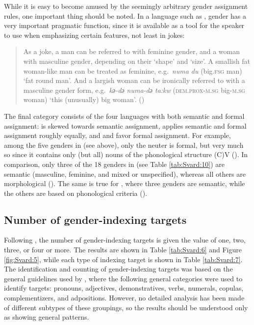 \documentclass[output=collectionpaper]{langsci/langscibook}
\begin{document}
While it is easy to become amused by the seemingly arbitrary gender assignment rules, one important thing should be noted. In a language such as , gender has a very important pragmatic function, since it is available as a tool for the speaker to use when emphasizing certain features, not least in jokes:

\begin{quote}
As a joke, a man can be referred to with feminine gender, and a woman with masculine gender, depending on their `shape' and `size'. A smallish fat woman-like man can be treated as feminine, e.g.\ \textit{numa du} (big.\textsc{fsg} man) `fat round man'. And a largish woman can be ironically referred to with a masculine gender form, e.g.\ \textit{kә-dә numa-dә ta:kw} (\textsc{dem.prox-m.sg} big-\textsc{m.sg} woman) `this (unusually) big woman'. (\citealt[121]{Aikhenvald2008})
\end{quote}

The final category consists of the four languages with both semantic and formal assignment:  is skewed towards semantic assignment,  applies semantic and formal assignment roughly equally, and  and  favor formal assignment. For example, among the five genders in  (see  above), only the neuter is formal, but very much so since it contains only (but all) nouns of the phonological structure (C)V (\citealt{Waelchli2018}). In comparison, only three of the 18 genders in  (see Table \ref{tab:Svard:10}) are semantic (masculine, feminine, and mixed or unspecified), whereas all others are morphological (\citealt[8]{Conrad1991}). The same is true for , where three genders are semantic, while the others are based on phonological criteria (\citealt[119]{Foley1991}).

\subsection{Number of gender-indexing targets}
\label{sec:Svard:3.4}

Following \citet[66]{DiGarbo2014}, the number of gender-indexing targets is given the value of one, two, three, or four or more. The results are shown in Table \ref{tab:Svard:6} and Figure \ref{fig:Svard:5}, while each type of indexing target is shown in Table \ref{tab:Svard:7}. The identification and counting of gender-indexing targets was based on the general guidelines used by \citet[66]{DiGarbo2014}, where the following general categories were used to identify targets: pronouns, adjectives, demonstratives, verbs, numerals, copulas, complementizers, and adpositions. However, no detailed analysis has been made of different subtypes of these groupings, so the results should be understood only as showing general patterns.
\end{document}
